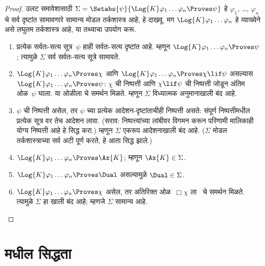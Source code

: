 \begin{proof}
  उलट समावेशासाठी $\Sigma = \Setabs{\psi}{\Log{K} \varphi_1 \dots \varphi_n \Proves \psi }$
  हे $\varphi_1$, \dots, $\varphi_n$ चे सर्व दृष्टांत
  सामावणारे सामान्य मोडल तर्कशास्त्र आहे, हे
  दाखवू. मग $\Log{K} \varphi_1 \dots \varphi_n$
  हे व्याख्येने असे लघुतम तर्कशास्त्र आहे,
  या तथ्याचा उपयोग करू.
  \begin{enumerate}
    \item प्रत्येक सर्वतः-सत्य सूत्र~$\psi$ हाही
      सर्वतः-सत्य दृष्टांत आहे. म्हणून
      $\Log{K}\varphi_1\dots\varphi_n \Proves \psi$;
      त्यामुळे $\Sigma$ सर्व सर्वतः-सत्य सूत्रे सामावते.
    \item $\Log{K}\varphi_1\dots\varphi_n \Proves \chi$
      आणि $\Log{K}\varphi_1\dots\varphi_n \Proves \chi \lif \psi$
      असल्यास $\Log{K}\varphi_1\dots\varphi_n \Proves \psi$:
      $\chi$ ची निष्पत्ती आणि $\chi \lif \psi$
      ची निष्पत्ती जोडून अंतिम ओळ~$\psi$
      घाला. या ओळीला \MP{} चे समर्थन मिळते.
      म्हणून $\Sigma$ विध्यात्मक अनुमानाखाली बंद आहे.
    \item $\psi$ ची निष्पत्ती असेल, तर
      $\psi$ च्या प्रत्येक आदेशन-दृष्टांताचीही
      निष्पत्ती असते: संपूर्ण निष्पत्तीमधील प्रत्येक सूत्र वर तेच आदेशन लावा.
      (सराव: निष्पत्त्यांच्या लांबीवर विगमन
      करून परिणामी मालिकाही योग्य निष्पत्ती
      आहे हे सिद्ध करा.) म्हणून $\Sigma$ एकरूप
      आदेशनाखाली बंद आहे. ($\Sigma$ मोडल तर्कशास्त्राच्या
      सर्व अटी पूर्ण करते, हे आता सिद्ध झाले.)
    \item $\Log{K}\varphi_1\dots\varphi_n \Proves \Ax{K}$;
      म्हणून $\Ax{K} \in \Sigma$.
    \item $\Log{K}\varphi_1\dots\varphi_n \Proves \Dual$
      असल्यामुळे $\Dual \in \Sigma$.
    \item $\Log{K}\varphi_1\dots\varphi_n \Proves \chi$
      असेल, तर अतिरिक्त ओळ~$\Box \chi$ ला~\Nec
      चे समर्थन मिळते. त्यामुळे $\Sigma$ हा
      \Nec खाली बंद आहे; म्हणजे $\Sigma$ सामान्य आहे.
  \end{enumerate}
\end{proof}













\section{ मधील सिद्धता}\label{nml:prf:prk:sec}

